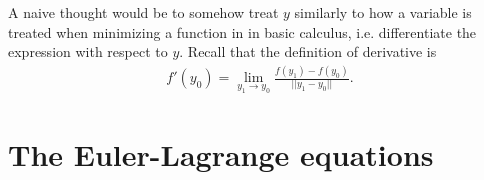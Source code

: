 A naive thought would be to somehow treat $y$ similarly to how a variable is treated when minimizing
a function in in basic calculus, i.e. differentiate the expression with respect to $y$. Recall that
the definition of derivative is
\begin{align*}
  f'(y_0) = \lim_{y_1 \to y_0}\frac{f(y_1) - f(y_0)}{||y_1 - y_0||}.
\end{align*}


\section{The Euler-Lagrange equations}

